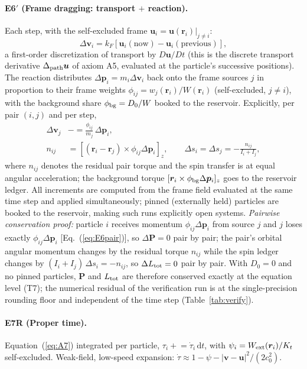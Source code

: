 \documentclass[aps,reprint,amsmath,amssymb,nofootinbib,superscriptaddress,floatfix]{revtex4-2}
\newcommand{\ud}{\mathrm{d}}
\newcommand{\vect}[1]{\bm{#1}}
\newcommand{\Kt}{K_t}
\newcommand{\Dz}{D_0}
\begin{document}
\paragraph*{E6$'$ (Frame dragging: transport $+$ reaction).}
Each step, with the self-excluded frame
$\vect{u}_i = \vect{u}(\vect{r}_i)|_{j \ne i}$:
\begin{equation}
\Delta\vect{v}_i = k_F\left[\vect{u}_i(\text{now})
 - \vect{u}_i(\text{previous})\right],
\label{eq:E6}
\end{equation}
a first-order discretization of transport by $D\vect{u}/Dt$
(this is the discrete transport derivative $\Delta_{\rm path}\vect{u}$
of axiom A5, evaluated at the particle's successive positions).
The reaction distributes $\Delta\vect{p}_i = m_i\Delta\vect{v}_i$ back
onto the frame sources $j$ in proportion to their frame weights
$\phi_{ij} = w_j(\vect{r}_i)/W(\vect{r}_i)$ (self-excluded,
$j \ne i$), with the background share $\phi_{\rm bg} = \Dz/W$ booked to
the reservoir.
Explicitly, per pair $(i,j)$ and per step,
\begin{align}
\Delta\vect{v}_j &\mathrel{-}= \frac{\phi_{ij}}{m_j}\,
 \Delta\vect{p}_i,\nonumber\\
n_{ij} &= \left[(\vect{r}_i-\vect{r}_j)\times
 \phi_{ij}\Delta\vect{p}_i\right]_z,\qquad
\Delta s_i = \Delta s_j = -\frac{n_{ij}}{I_i+I_j},
\label{eq:E6pair}
\end{align}
where $n_{ij}$ denotes the residual pair torque and the spin transfer
is at
equal angular acceleration; the background torque
$[\vect{r}_i \times \phi_{\rm bg}\Delta\vect{p}_i]_z$ goes to the
reservoir ledger.
All increments are computed from the frame field evaluated at the same
time step and applied
simultaneously; pinned (externally held) particles are booked to the
reservoir, making such runs explicitly open systems.
\emph{Pairwise conservation proof:} particle $i$ receives momentum
$\phi_{ij}\Delta\vect{p}_i$ from source $j$ and $j$ loses exactly
$\phi_{ij}\Delta\vect{p}_i$ [Eq.~(\ref{eq:E6pair})], so
$\Delta\vect{P} = 0$ pair by pair; the pair's orbital angular momentum
changes by the residual torque $n_{ij}$ while the spin ledger changes
by $(I_i+I_j)\,\Delta s_i = -n_{ij}$, so $\Delta L_{\rm tot} = 0$ pair
by pair.
With $\Dz = 0$ and no pinned particles, $\vect{P}$ and $L_{\rm tot}$
are therefore conserved exactly at the equation level (T7); the
numerical residual of the verification run is at the single-precision
rounding floor and independent of the time step
(Table~\ref{tab:verify}).

\paragraph*{E7R (Proper time).}
Equation~(\ref{eq:A7}) integrated per particle,
$\tau_i \mathrel{+}= \dot\tau_i\,\ud t$, with
$\psi_i = W_{\rm ext}(\vect{r}_i)/\Kt$ self-excluded.
Weak-field, low-speed expansion:
$\dot\tau \approx 1 - \psi - |\vect{v}-\vect{u}|^2/(2c_0^2)$.
\end{document}

